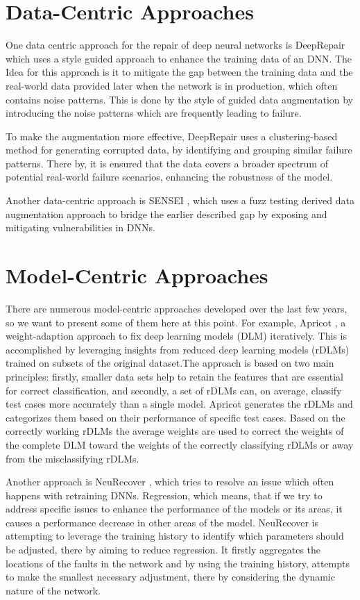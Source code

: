 \section{Data-Centric Approaches}\label{sec:data-centric-approaches}
One data centric approach for the repair of deep neural networks is DeepRepair \cite{yu_deeprepair_2022} which uses a style guided approach to enhance the training data of an DNN. The Idea for this approach is it to mitigate the gap between the training data and the real-world data provided later when the network is in production, which often contains noise patterns.
This is done by the style of guided data augmentation by introducing the noise patterns which are frequently leading to failure.

To make the augmentation more effective, DeepRepair uses a clustering-based method for generating corrupted data, by identifying and grouping similar failure patterns.
There by, it is ensured that the data covers a broader spectrum of potential real-world failure scenarios, enhancing the robustness of the model.

Another data-centric approach is SENSEI \cite{gao_fuzz_2020}, which uses a fuzz testing derived data augmentation approach to bridge the earlier described gap by exposing and mitigating vulnerabilities in DNNs.

\section{Model-Centric Approaches}\label{sec:model-centric-approaches}
There are numerous model-centric approaches developed over the last few years, so we want to present some of them here at this point.
For example, Apricot \cite{zhang_apricot_2019}, a weight-adaption approach to fix deep learning models (DLM) iteratively.
This is accomplished by leveraging insights from reduced deep learning models (rDLMs) trained on subsets of the original dataset.The approach is based on two main principles: firstly, smaller data sets help to retain the features that are essential for correct classification, and secondly, a set of rDLMs can, on average, classify test cases more accurately than a single model.
Apricot generates the rDLMs and categorizes them based on their performance of specific test cases.
Based on the correctly working rDLMs the average weights are used to correct the weights of the complete DLM toward the weights of the correctly classifying rDLMs or away from the misclassifying rDLMs.

Another approach is NeuRecover \cite{tokui_neurecover_2022}, which tries to resolve an issue which often happens with retraining DNNs. Regression, which means, that if we try to address specific issues to enhance the performance of the models or its areas, it causes a performance decrease in other areas of the model.
NeuRecover is attempting to leverage the training history to identify which parameters should be adjusted, there by aiming to reduce regression.
It firstly aggregates the locations of the faults in the network and by using the training history, attempts to make the smallest necessary adjustment, there by considering the dynamic nature of the network.

